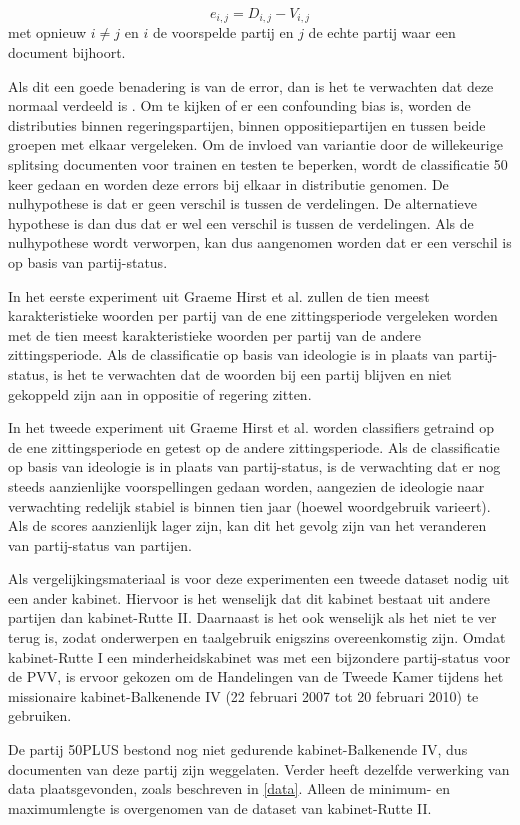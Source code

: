 \begin{equation}
\label{eq:error}
e_{i,j} = D_{i,j} - V_{i,j}
\end{equation}
met opnieuw $i\neq j$ en $i$ de voorspelde partij en $j$ de echte partij waar een document bijhoort. \par
Als dit een goede benadering is van de error, dan is het te verwachten dat deze normaal verdeeld is \cite{citeulike:7531484}. Om te kijken of er een confounding bias is, worden de distributies binnen regeringspartijen, binnen oppositiepartijen en tussen beide groepen met elkaar vergeleken. Om de invloed van variantie door de willekeurige splitsing documenten voor trainen en testen te beperken, wordt de classificatie 50 keer gedaan en worden deze errors bij elkaar in distributie genomen. De nulhypothese is dat er geen verschil is tussen de verdelingen. De alternatieve hypothese is dan dus dat er wel een verschil is tussen de verdelingen. Als de nulhypothese wordt verworpen, kan dus aangenomen worden dat er een verschil is op basis van partij-status.\par
In het eerste experiment uit Graeme Hirst et al. zullen de tien meest karakteristieke woorden per partij van de ene zittingsperiode vergeleken worden met de tien meest karakteristieke woorden per partij van de andere zittingsperiode. Als de classificatie op basis van ideologie is in plaats van partij-status, is het te verwachten dat de woorden bij een partij blijven en niet gekoppeld zijn aan in oppositie of regering zitten. \par
In het tweede experiment uit Graeme Hirst et al. worden classifiers getraind op de ene zittingsperiode en getest op de andere zittingsperiode. Als de classificatie op basis van ideologie is in plaats van partij-status, is de verwachting dat er nog steeds aanzienlijke voorspellingen gedaan worden, aangezien de ideologie naar verwachting redelijk stabiel is binnen tien jaar (hoewel woordgebruik varieert). Als de scores aanzienlijk lager zijn, kan dit het gevolg zijn van het veranderen van partij-status van partijen.\par
Als vergelijkingsmateriaal is voor deze experimenten een tweede dataset nodig uit een ander kabinet. Hiervoor is het wenselijk dat dit kabinet bestaat uit andere partijen dan kabinet-Rutte II. Daarnaast is het ook wenselijk als het niet te ver terug is, zodat onderwerpen en taalgebruik enigszins overeenkomstig zijn. Omdat kabinet-Rutte I een minderheidskabinet was met een bijzondere partij-status voor de PVV, is ervoor gekozen om de Handelingen van de Tweede Kamer tijdens het missionaire kabinet-Balkenende IV (22 februari 2007 tot 20 februari 2010) te gebruiken.\par
De partij 50PLUS bestond nog niet gedurende kabinet-Balkenende IV, dus documenten van deze partij zijn weggelaten. Verder heeft dezelfde verwerking van data plaatsgevonden, zoals beschreven in \ref{data}. Alleen de minimum- en maximumlengte is overgenomen van de dataset van kabinet-Rutte II.\par

